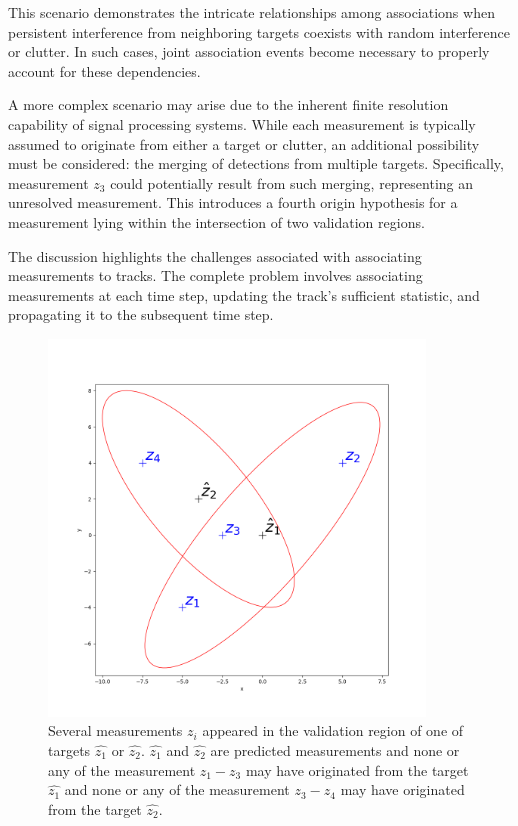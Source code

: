 This scenario demonstrates the intricate relationships among associations when persistent interference from neighboring targets coexists with random interference or clutter. In such cases, joint association events become necessary to properly account for these dependencies.

A more complex scenario may arise due to the inherent finite resolution capability of signal processing systems. While each measurement is typically assumed to originate from either a target or clutter, an additional possibility must be considered: the merging of detections from multiple targets. Specifically, measurement $z_3$ could potentially result from such merging, representing an unresolved measurement. This introduces a fourth origin hypothesis for a measurement lying within the intersection of two validation regions.

The discussion highlights the challenges associated with associating measurements to tracks. The complete problem
involves associating measurements at each time step, updating the track's sufficient statistic, and propagating it to
the subsequent time step.

\begin{figure}[h]
    \centering
    \includegraphics[width=10cm]{text/chapter_02/imgs/clutter_multiTarget}
    \caption{Several measurements $z_i$ appeared in the validation region of one of targets $\hat{z_1}$ or $\hat{z_2}$. $\hat{z_1}$ and $\hat{z_2}$ are predicted
    measurements and none or any of the measurement $z_1 - z_3$ may have originated from the target $\hat{z_1}$ and none or any of the measurement $z_3 - z_4$ may have originated from the target $\hat{z_2}$.}
    \label{fig:twoTargetsInClutter}
\end{figure}


